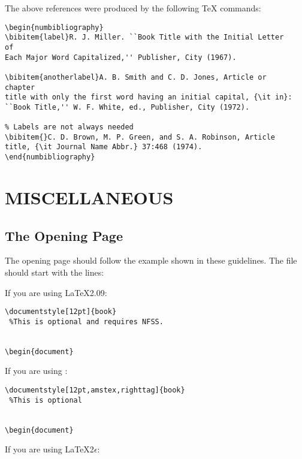 \documentclass[12pt]{book}
\begin{document}
\smallskip

The above references were produced by the following {\TeX}
commands:
\begin{verbatim}
\begin{numbibliography}
\bibitem{label}R. J. Miller. ``Book Title with the Initial Letter
of
Each Major Word Capitalized,'' Publisher, City (1967).

\bibitem{anotherlabel}A. B. Smith and C. D. Jones, Article or
chapter
title with only the first word having an initial capital, {\it in}:
``Book Title,'' W. F. White, ed., Publisher, City (1972).

% Labels are not always needed
\bibitem{}C. D. Brown, M. P. Green, and S. A. Robinson, Article
title, {\it Journal Name Abbr.} 37:468 (1974).
\end{numbibliography}
\end{verbatim}

\section{MISCELLANEOUS}

\vskip -1pc

\subsection{The Opening Page}

The opening page should follow the example shown in these
guidelines. The file should start with the lines:

\smallskip

If you are using \LaTeX 2.09:

\begin{verbatim}
\documentstyle[12pt]{book}
 %This is optional and requires NFSS.


\begin{document}
\end{verbatim}

\smallskip

If you are using \AmSLaTeX:

\begin{verbatim}
\documentstyle[12pt,amstex,righttag]{book}
 %This is optional


\begin{document}
\end{verbatim}

\smallskip

If you are using \LaTeX 2$\epsilon$:
\end{document}
